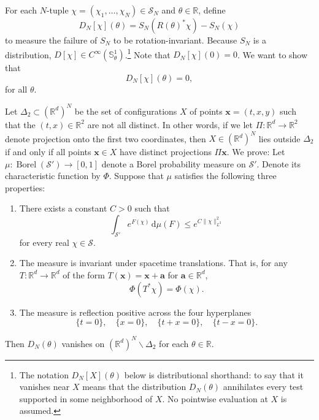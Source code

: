 \documentclass[11pt, letterpaper, reqno]{amsart}
\theoremstyle{definition}
\newenvironment{theorem}
{\pushQED{\qed}\renewcommand{\qedsymbol}{$\blacksquare\square$}\theoremxx}
{\popQED\endtheoremxx}
\theoremstyle{remark}
\newcommand{\bbR}{\mathbb{R}}
\newcommand{\bbS}{\mathbb{S}}
\newcommand{\calS}{\mathcal{S}}
\newcommand{\bfa}{\mathbf{a}}
\newcommand{\bfx}{\mathbf{x}}
\newcommand{\dd}{\,\mathrm{d}}
\begin{document}
For each $N$-tuple $\chi=(\chi_1,\dots,\chi_N)\in \calS_N$
and $\theta\in \bbR$, define 
\begin{equation}
    D_N[\chi](\theta) = 
    S_N (R(\theta)^* \chi) -S_N(\chi)
\end{equation}
to measure the failure of $S_N$ to be rotation-invariant. 
Because $S_N$ is a distribution, $D[\chi] \in C^\infty(\bbS^1_\theta)$.\footnote{The notation $D_N[X](\theta)$ below is distributional shorthand: to say that it vanishes near $X$ means that the distribution $D_N(\theta)$ annihilates every test supported in some neighborhood of $X$. No pointwise evaluation at $X$ is assumed.} Note that $D_N[\chi](0)=0$. We want to show that 
\begin{equation} 
    D_N[\chi](\theta)=0,
\end{equation}
for all $\theta$. 

Let $\Delta_2\subset (\bbR^d)^N$ be the set of configurations $X$ of points $\bfx=(t,x,y)$ such that the $(t,x)\in \bbR^2$ are not all distinct. In other words, if we let $\Pi:\bbR^d\to \bbR^2$ denote projection onto the first two coordinates, then $X\in (\bbR^d)^N$ lies outside $\Delta_2$ if and only if all points $\bfx\in X$ have distinct projections $\Pi \bfx$. 
We prove:
\begin{theorem}\label{thm:weak}
    Let $\mu:\operatorname{Borel}(\calS')\to [0,1]$ denote a Borel probability measure on $\calS'$. Denote its characteristic function by $\Phi$. Suppose that $\mu$ satisfies the following three properties:
    \begin{enumerate}[label=(\roman*)]
        \item  There exists a constant $C>0$ such that 
    \begin{equation}
        \int_{\calS'} e^{F(\chi)} \dd \mu(F) \leq e^{C \lVert \chi \rVert_{L^2}^2}
    \end{equation}
    for every real $\chi\in\calS$. 
    \item  
    The measure is invariant under spacetime translations. That is, for any $T:\bbR^d\to \bbR^d$ of the form $T(\bfx)=\bfx+\bfa$ for $\bfa\in \bbR^d$, 
    \begin{equation}
        \Phi(T^* \chi) = \Phi(\chi). 
    \end{equation}
    \item
    The measure is reflection positive across the four hyperplanes 
    \begin{equation}
        \{t=0\},\quad \{x=0\},\quad \{t+x=0\},\quad \{t-x=0\}.
    \end{equation}
    \end{enumerate}
    Then $D_N(\theta)$ vanishes on $(\bbR^d)^N\backslash \Delta_2$ for each $\theta\in \bbR$. 
\end{theorem}
\end{document}
